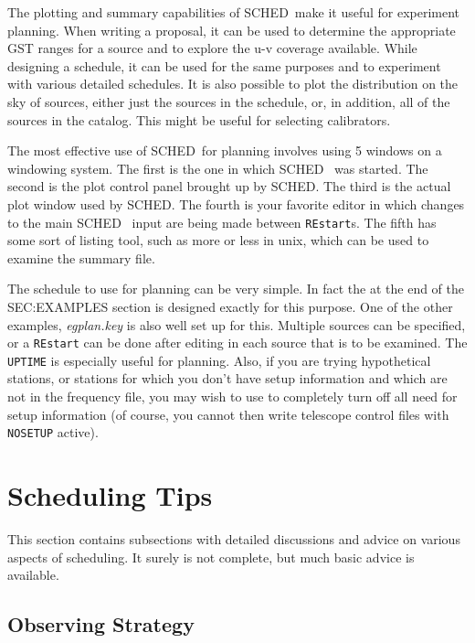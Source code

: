 \documentclass{report}
\newcommand{\sched}{{\sc SCHED}}
\newcommand{\schedb}{{\sc SCHED~}}
\begin{document}
The plotting and summary capabilities of \schedb make it useful for
experiment planning.  When writing a proposal, it can be used to
determine the appropriate GST ranges for a source and to explore the
u-v coverage available.  While designing a schedule, it can be used
for the same purposes and to experiment with various detailed
schedules.  It is also possible to plot the distribution on the sky of
sources, either just the sources in the schedule, or, in addition, all
of the sources in the catalog.  This might be useful for selecting
calibrators.

The most effective use of \schedb for planning involves using 5
windows on a windowing system.  The first is the one in which \schedb
was started.  The second is the plot control panel brought up by
\sched.  The third is the actual plot window used by \sched.  The
fourth is your favorite editor in which changes to the main \schedb
input are being made between {\tt REstart}s.  The fifth has some sort
of listing tool, such as {\sc more} or {\sc less} in unix, which can
be used to examine the summary file.

The schedule to use for planning can be very simple.  In fact the
 at the end of the 
{SEC:EXAMPLES} section is designed exactly for this purpose.
One of the other examples, {\sl egplan.key} is also well set up for this.
Multiple sources can be specified, or a {\tt REstart}
can be done after editing in each source that is to be examined.  The
 {\tt UPTIME} is especially useful
for planning.  Also, if you are trying hypothetical stations, or stations
for which you don't have setup information and which are not in the
frequency file, you may wish to use 
to completely turn off all need for setup information (of course, you
cannot then write telescope control files with {\tt NOSETUP} active).

\section{\label{SEC:TIPS}Scheduling Tips}

This section contains subsections with detailed discussions and
advice on various aspects of scheduling.  It surely is not complete, but
much basic advice is available.

\subsection{\label{SSEC:STRATEGY}Observing Strategy}
\end{document}
